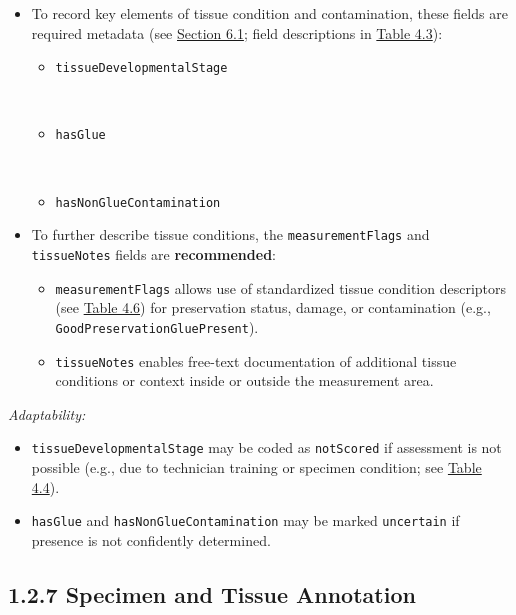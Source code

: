 \documentclass[
  letterpaper,
  DIV=11,
  numbers=noendperiod]{scrreprt}
\providecommand{\tightlist}{%
  \setlength{\itemsep}{0pt}\setlength{\parskip}{0pt}}
\begin{document}
\begin{itemize}
\tightlist
\item
  To record key elements of tissue condition and contamination, these
  fields are required metadata (see
  \hyperref[sources-of-variation-in-herbarium-plant-tissues]{Section
  6.1}; field descriptions in \hyperref[tbl-4-3]{Table 4.3}):

  \begin{itemize}
  \tightlist
  \item
    \texttt{tissueDevelopmentalStage}\strut \\
  \item
    \texttt{hasGlue}\strut \\
  \item
    \texttt{hasNonGlueContamination}
  \end{itemize}
\item
  To further describe tissue conditions, the \texttt{measurementFlags}
  and \texttt{tissueNotes} fields are \textbf{recommended}:

  \begin{itemize}
  \tightlist
  \item
    \texttt{measurementFlags} allows use of standardized tissue
    condition descriptors (see \hyperref[tbl-4-6]{Table 4.6}) for
    preservation status, damage, or contamination (e.g.,
    \texttt{GoodPreservation}\textbar{}\texttt{GluePresent}).\\
  \item
    \texttt{tissueNotes} enables free-text documentation of additional
    tissue conditions or context inside or outside the measurement area.
  \end{itemize}
\end{itemize}

\emph{Adaptability:}

\begin{itemize}
\tightlist
\item
  \texttt{tissueDevelopmentalStage} may be coded as \texttt{notScored}
  if assessment is not possible (e.g., due to technician training or
  specimen condition; see \hyperref[tbl-4-4]{Table 4.4}).\\
\item
  \texttt{hasGlue} and \texttt{hasNonGlueContamination} may be marked
  \texttt{uncertain} if presence is not confidently determined.
\end{itemize}

\subsection{1.2.7 Specimen and Tissue
Annotation}\label{specimen-and-tissue-annotation}
\end{document}
